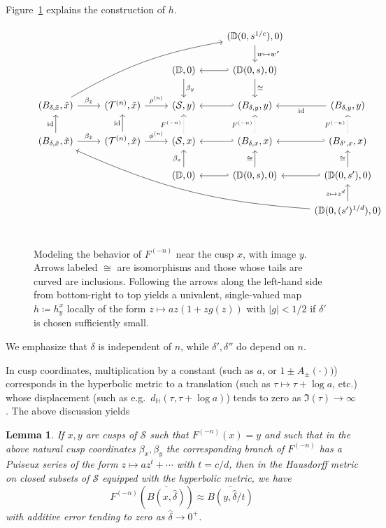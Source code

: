 \documentclass{amsart}
\newcommand\IH{{\mathbb{H}}}
\newcommand\ID{{\mathbb{D}}}
\newtheorem{lem}[thm]{Lemma}
\theoremstyle{definition}
\theoremstyle{remark}
\newcommand{\cT}{\mathcal{T}}
\newcommand{\cS}{\mathcal{S}}
\begin{document}
Figure~\ref{fig:cuspdiagram} explains the construction of $h$.   
\begin{figure}
\[\begin{tikzcd}
&&  & (\ID(0,s^{1/c}),0) \arrow[d,"w \mapsto w^c"]\\
&& (\ID,0) \arrow[d,"\beta_y"] & (\ID(0,s),0) \arrow[d,"\cong"]\arrow[l,hook']\\
(B_{\delta, \tilde{x}},\tilde{x}) \arrow[r,"\beta_{\tilde{x}}"]  \arrow[rrruu,bend left=10] & (\cT^{(n)}, \tilde{x}) \arrow[r,"\rho^{(n)}"] & (\cS, y) & (B_{\delta, y},y)\arrow[l,hook'] &(B_{\delta,y},y) \arrow[l,"\text{id}"]\\
(B_{\delta, \tilde{x}},\tilde{x})\arrow[u,"\text{id}"] \arrow[r,"\beta_{\tilde{x}}"] & (\cT^{(n)}, \tilde{x}) \arrow[r,"\phi^{(n)}"]\arrow[u,"\text{id}"] & (\cS, x) \arrow[u,dotted,"F^{(-n)}"] & (B_{\delta, x},x)\arrow[u,dotted,"F^{(-n)}"]\arrow[l,hook'] & (B_{\delta',x},x)\arrow[l,hook']\arrow[u,dotted,"F^{(-n)}"]\\
& & (\ID,0) \arrow[u,"\beta_x"] & (\ID(0,s),0)\arrow[u,"\cong"]\arrow[l,hook'] &(\ID(0,s'),0)\arrow[u,"\cong"] \arrow[l,hook']\\
&&  & &(\ID(0,(s')^{1/d}),0)\arrow[u,"z \mapsto z^d"]\arrow[uullll,bend left=10]\\
\end{tikzcd}
\]
\caption{\sf Modeling the behavior of $F^{(-n)}$ near the cusp $x$, with image $y$. Arrows labeled $\cong$ are isomorphisms and those whose tails are curved are inclusions.  Following the arrows along the left-hand side from bottom-right to top yields a univalent, single-valued map $h\coloneqq h^x_y$ locally of the form $z \mapsto az(1+zg(z))$ with $|g|<1/2$ if $\delta'$ is chosen sufficiently small.}
\label{fig:cuspdiagram}
\end{figure}

We emphasize that $\delta$ is independent of $n$, while $\delta', \delta''$ do depend on $n$.  

In cusp coordinates, multiplication by a constant (such as $a$, or $1\pm A_\pm(\cdot))$) corresponds in the hyperbolic metric to a translation (such as $\tau \mapsto \tau+\log a$, etc.) whose displacement (such as e.g.\ $d_\IH(\tau, \tau+\log a)$) tends to zero as $\Im(\tau)\to\infty$.  The above discussion yields 

\begin{lem}\label{lem:t}
  If $x, y$ are cusps of $\cS$ such that $F^{(-n)}(x)=y$ and such that in the above natural cusp coordinates $\beta_x, \beta_y$ the corresponding branch of $F^{(-n)}$ has a Puiseux series of the form $z \mapsto az^t+\cdots$ with $t=c/d$, then in the Hausdorff metric on closed subsets of $\cS$ equipped with the hyperbolic metric, we have 
\[ F^{(-n)}(\overline{B(x,\hat{\delta})}) \approx \overline{B(y,\hat{\delta}/t)}\]
with additive error tending to zero  as $\hat{\delta}\to 0^+$.
\end{lem}
\end{document}
